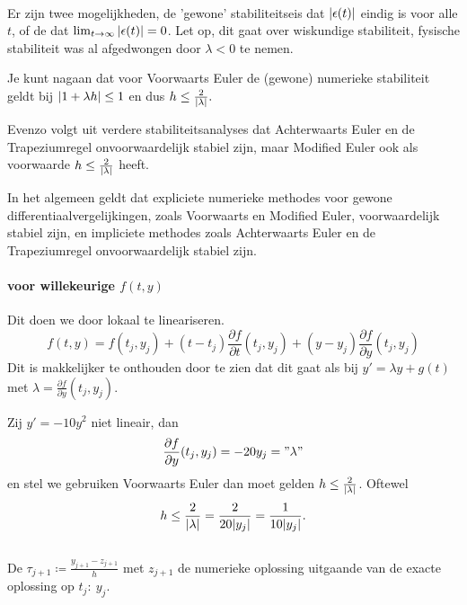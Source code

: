 \documentclass{2wn20summary}
\begin{document}
			 \paragraph{ }
			 Er zijn twee mogelijkheden, de 'gewone' stabiliteitseis dat $ \abs{\epsilon(t)} $ eindig is voor alle $t$, of de  dat $ \lim_{t\to \infty} \abs{\epsilon(t)} = 0 $. Let op, dit gaat over wiskundige stabiliteit, fysische stabiliteit was al afgedwongen door $\lambda <0$ te nemen.

			 Je kunt nagaan dat voor Voorwaarts Euler de (gewone) numerieke stabiliteit geldt bij $ {\left|1+\lambda h\right|} \le 1 $ en dus $ h \le \frac{2}{{\left|\lambda\right|}}. $

			 Evenzo volgt uit verdere stabiliteitsanalyses dat Achterwaarts Euler en de Trapeziumregel onvoorwaardelijk stabiel zijn, maar Modified Euler ook als voorwaarde $ h \le \frac{2}{{\left|\lambda\right|}} $ heeft.
			 \begin{theorem}In het algemeen geldt dat expliciete numerieke methodes voor gewone differentiaalvergelijkingen, zoals Voorwaarts en Modified Euler, voorwaardelijk stabiel zijn, en impliciete methodes zoals Achterwaarts Euler en de Trapeziumregel onvoorwaardelijk stabiel zijn.
			 	\end{theorem}

			 	\paragraph{ voor willekeurige $ f(t,y) $}

			 	Dit doen we door lokaal te lineariseren.
			 	\[
				 	f(t,y) = f(t_j,y_j) + (t-t_j) \frac{\partial f}{\partial t}(t_j,y_j) + (y-y_j)\frac{\partial f}{\partial y}(t_j,y_j)
			 	 \]
			 	 Dit is makkelijker te onthouden door te zien dat dit gaat als bij $y'=\lambda y +g(t)$ met $\lambda =\frac{\partial f}{\partial y}(t_j,y_j)$.
			 	 \begin{voorbeeld}

			 	 	Zij $ y'=-10y^2 $ niet lineair, dan
			 	 	\[
				 	 	\frac{\partial f}{\partial y}(t_j,y_j) = -20 y_j = "\lambda"
			 	 	 \] en stel we gebruiken Voorwaarts Euler dan moet gelden $ h \le \frac{2}{{\left|\lambda\right|}} $. Oftewel \[
				 	 	 h \le \frac{2}{{\left|\lambda\right|}}= \frac{2}{20{\left|y_j\right|}} = \frac{1}{10{\left|y_j\right|}}.
			 	 	  \]
		 	 	  \end{voorbeeld}

		\subsection{ }
			\begin{define}
			De  $\tau_{j+1} \coloneqq \frac{y_{j+1}-z_{j+1}}{h}$ met $z_{j+1}$ de numerieke oplossing uitgaande van de exacte oplossing op $t_j:\ y_j$.
			\end{define}
\end{document}
